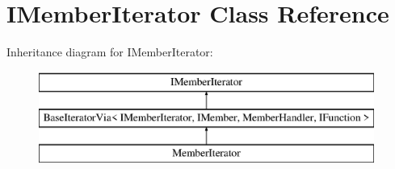\hypertarget{class_i_member_iterator}{}\section{I\+Member\+Iterator Class Reference}
\label{class_i_member_iterator}
Inheritance diagram for I\+Member\+Iterator\+:\begin{figure}[H]
\begin{center}
\leavevmode
\includegraphics[height=3.000000cm]{class_i_member_iterator}
\end{center}
\end{figure}
